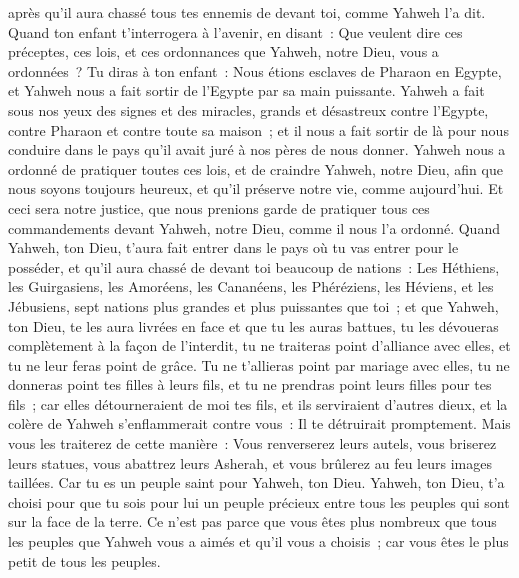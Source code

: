\begin{multicols}{2}
après qu'il aura chassé tous tes ennemis de devant toi, comme Yahweh l'a dit.
Quand ton enfant t'interrogera à l'avenir, en disant~: Que veulent dire ces préceptes, ces lois, et ces ordonnances que Yahweh, notre Dieu, vous a ordonnées~?
Tu diras à ton enfant~: Nous étions esclaves de Pharaon en Egypte, et Yahweh nous a fait sortir de l'Egypte par sa main puissante.
Yahweh a fait sous nos yeux des signes et des miracles, grands et désastreux contre l'Egypte, contre Pharaon et contre toute sa maison~;
et il nous a fait sortir de là pour nous conduire dans le pays qu'il avait juré à nos pères de nous donner.
Yahweh nous a ordonné de pratiquer toutes ces lois, et de craindre Yahweh, notre Dieu, afin que nous soyons toujours heureux, et qu'il préserve notre vie, comme aujourd'hui.
Et ceci sera notre justice, que nous prenions garde de pratiquer tous ces commandements devant Yahweh, notre Dieu, comme il nous l'a ordonné.
\VerseOne{}Quand Yahweh, ton Dieu, t'aura fait entrer dans le pays où tu vas entrer pour le posséder, et qu'il aura chassé de devant toi beaucoup de nations~: Les Héthiens, les Guirgasiens, les Amoréens, les Cananéens, les Phéréziens, les Héviens, et les Jébusiens, sept nations plus grandes et plus puissantes que toi~;
et que Yahweh, ton Dieu, te les aura livrées en face et que tu les auras battues, tu les dévoueras complètement à la façon de l'interdit, tu ne traiteras point d'alliance avec elles, et tu ne leur feras point de grâce.
Tu ne t'allieras point par mariage avec elles, tu ne donneras point tes filles à leurs fils, et tu ne prendras point leurs filles pour tes fils~;
car elles détourneraient de moi tes fils, et ils serviraient d'autres dieux, et la colère de Yahweh s'enflammerait contre vous~: Il te détruirait promptement.
Mais vous les traiterez de cette manière~: Vous renverserez leurs autels, vous briserez leurs statues, vous abattrez leurs Asherah, et vous brûlerez au feu leurs images taillées.
Car tu es un peuple saint pour Yahweh, ton Dieu. Yahweh, ton Dieu, t'a choisi pour que tu sois pour lui un peuple précieux entre tous les peuples qui sont sur la face de la terre.
Ce n'est pas parce que vous êtes plus nombreux que tous les peuples que Yahweh vous a aimés et qu'il vous a choisis~; car vous êtes le plus petit de tous les peuples.

\end{multicols}
